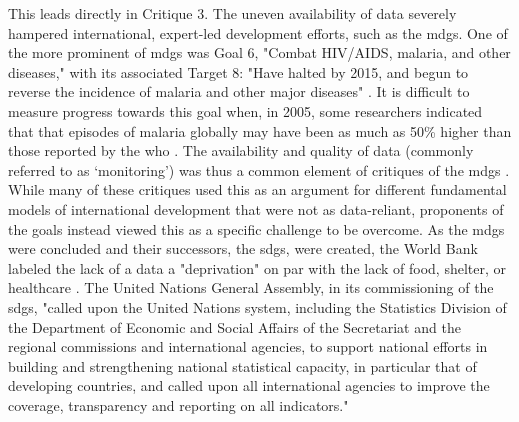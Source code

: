 This leads directly in Critique 3. The uneven availability of data severely hampered international, expert-led development efforts, such as the \acp{mdg}. One of the more prominent of \acp{mdg} was Goal 6, "Combat HIV/AIDS, malaria, and other diseases," with its associated Target 8: "Have halted by 2015, and begun to reverse the incidence of malaria and other major diseases" \cite{inter-agencyandexpertgrouponmdgindicatorsMillenniumDevelopmentGoals2015}. It is difficult to measure progress towards this goal when, in 2005, some researchers indicated that that episodes of malaria globally may have been as much as 50\% higher than those reported by the \ac{who} \cite{snowGlobalDistributionClinical2005}. The availability and quality of data (commonly referred to as `monitoring') was thus a common element of critiques of the \acp{mdg} \cite{alstonShipsPassingNight2005,fukuda-parrPowerNumbersCritical2014,reddyGlobalDevelopmentGoals2008}. While many of these critiques used this as an argument for different fundamental models of international development that were not as data-reliant, proponents of the goals instead viewed this as a specific challenge to be overcome. As the \acp{mdg} were concluded and their successors, the \acp{sdg}, were created, the World Bank labeled the lack of a data a "deprivation" on par with the lack of food, shelter, or healthcare \cite{DataDeprivationAnother}. The United Nations General Assembly, in its commissioning of the \acp{sdg}, "called upon the United Nations system, including the Statistics Division of the Department of Economic and Social Affairs of the Secretariat and the regional commissions and international agencies, to support national efforts in building and strengthening national statistical capacity, in particular that of developing countries, and called upon all international agencies to improve the coverage, transparency and reporting on all indicators."

